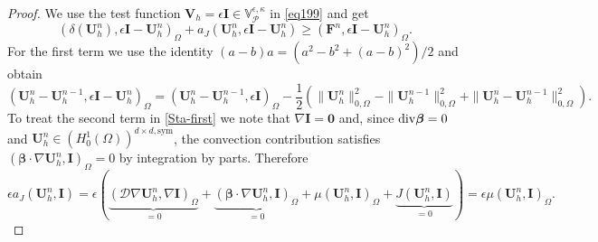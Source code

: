\documentclass[final,12pt]{amsart}
\theoremstyle{plain}
\theoremstyle{definition}
\newcommand\bbeta{{\boldsymbol{\beta}}}
\newcommand\calP{{\mathcal{P}}}
\newcommand\bU{\mathbf{U}}
\newcommand\bV{\mathbf{V}}
\begin{document}
\begin{proof}
	We use the test function $\bV_h^{}=\epsilon \mathbf{I} \in \mathbb{V}_{\calP}^{\epsilon,\kappa}$ in \eqref{eq199} and get
	\begin{equation}\label{Sta-first}
	(\delta (\mathbf{U}_{h}^{n}),\epsilon \mathbf{I}-\mathbf{U}_{h}^{n})_{\Omega}
	+ a_{J}(\mathbf{U}_{h}^{n},\epsilon\mathbf{I}-\mathbf{U}_{h}^{n})
	\geq (\mathbf{F}^{n},\epsilon\mathbf{I}-\mathbf{U}_{h}^{n})_{\Omega}.
	\end{equation}
	For the first term we use the identity $(a-b)a=(a^2-b^2+(a-b)^2)/2$ and obtain
	\begin{equation}\label{Sta-second}
	(\mathbf{U}_{h}^{n}-\mathbf{U}_{h}^{n-1}, \epsilon \mathbf{I}-\mathbf{U}_{h}^{n})_{\Omega}
	= (\mathbf{U}_{h}^{n}-\mathbf{U}_{h}^{n-1}, \epsilon \mathbf{I})_\Omega
	-\frac{1}{2} \left(  \| \mathbf{U}_{h}^{n} \|_{0,\Omega}^{2}-\| \mathbf{U}_{h}^{n-1} \|_{0,\Omega}^{2}
	+ \| \mathbf{U}_{h}^{n} - \mathbf{U}_{h}^{n-1} \|_{0,\Omega}^{2} \right).
	\end {equation}
	To treat the second term in \eqref{Sta-first} we note that $\nabla \mathbf{I}=\mathbf{0}$ and, since ${\rm div} \bbeta=0$ and $\bU_h^n\in (H_0^1(\Omega))^{d\times d,\mathrm{sym}}$,
	the convection contribution satisfies $(\bbeta\cdot\nabla\bU_h^n,\mathbf{I})_\Omega=0$ by integration by parts.
	Therefore
	\begin{equation}\label{Sta-third}
	\epsilon a_{J}(\mathbf{U}_{h}^{n}, \mathbf{I})
	=\epsilon\left(\underbrace{\left(\mathcal{D}\nabla \bU_{h}^{n},\nabla \mathbf{I}\right)_{\Omega}}_{= 0}
	+\underbrace{\left(\bbeta\cdot\nabla\bU_h^n,\mathbf{I}\right)_{\Omega}}_{= 0}
	+\mu\left( \mathbf{U}_{h}^{n},\mathbf{I}\right)_{\Omega}
	+\underbrace{J(\mathbf{U}_{h}^{n},\mathbf{I})}_{= 0}\right)
	=\epsilon\mu( \mathbf{U}_{h}^{n},\mathbf{I})_{\Omega}.
	\end{equation}


\end{proof}
\end{document}
